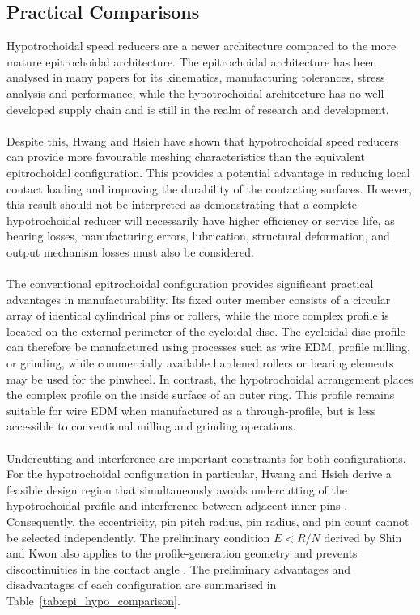 \documentclass[internal]{../../../classes/nervtech-research}
\begin{document}
\subsection{Practical Comparisons}
Hypotrochoidal speed reducers are a newer architecture compared to the more mature
epitrochoidal architecture.
The epitrochoidal architecture has been analysed in many papers for its kinematics,
manufacturing tolerances, stress analysis and performance, while the hypotrochoidal
architecture has no well developed supply chain and is still in the realm of research
and development.
\\\\
Despite this, Hwang and Hsieh \cite{CycloidalKinematics} have shown that hypotrochoidal
speed reducers can provide
more favourable meshing characteristics than the equivalent epitrochoidal
configuration.
This provides a potential advantage in reducing local contact loading and improving
the durability of the contacting surfaces.
However, this result should not be interpreted as demonstrating that a complete
hypotrochoidal reducer will necessarily have higher efficiency or service life,
as bearing losses, manufacturing errors, lubrication, structural deformation,
and output mechanism losses must also be considered.
\\\\
The conventional epitrochoidal configuration provides significant practical
advantages in manufacturability.
Its fixed outer member consists of a circular array of identical cylindrical
pins or rollers, while the more complex profile is located on the external
perimeter of the cycloidal disc.
The cycloidal disc profile can therefore be manufactured using processes such
as wire EDM, profile milling, or grinding, while commercially available hardened
rollers or bearing elements may be used for the pinwheel.
In contrast, the hypotrochoidal arrangement places the complex profile on the
inside surface of an outer ring.
This profile remains suitable for wire EDM when manufactured as a through-profile,
but is less accessible to conventional milling and grinding operations.
\\\\
Undercutting and interference are important constraints for both configurations.
For the hypotrochoidal configuration in particular, Hwang and Hsieh derive a
feasible design region that simultaneously avoids undercutting of the
hypotrochoidal profile and interference between adjacent inner pins
\cite{HypotrochoidalNonUndercutting}.
Consequently, the eccentricity, pin pitch radius, pin radius, and pin count
cannot be selected independently.
The preliminary condition $E<R/N$ derived by Shin and Kwon also applies to the
profile-generation geometry and prevents discontinuities in the contact angle
\cite{MechanismAndMachineTheoryPaper}.
The preliminary advantages and disadvantages of each configuration are summarised
in Table~\ref{tab:epi_hypo_comparison}.
\end{document}
